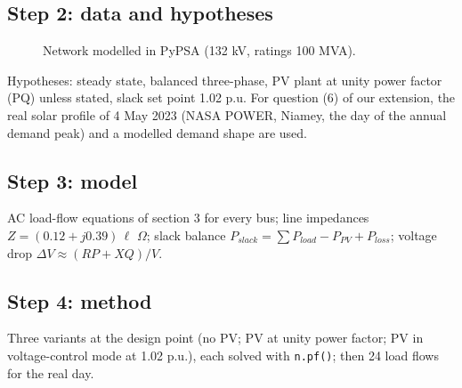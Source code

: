 \documentclass[11pt,a4paper]{article}
\begin{document}
\subsection{Step 2: data and hypotheses}
\begin{figure}[h]\centering
{}
\caption{Network modelled in PyPSA (132 kV, ratings 100 MVA).}
\end{figure}
Hypotheses: steady state, balanced three-phase, PV plant at unity power factor (PQ) unless stated, slack set point 1.02 p.u.
For question (6) of our extension, the real solar profile of 4 May 2023 (NASA POWER, Niamey, the day of the annual
demand peak) and a modelled demand shape are used.

\subsection{Step 3: model}
AC load-flow equations of section 3 for every bus; line impedances $Z = (0.12 + j0.39)\,\ell$ $\Omega$; slack
balance $P_{slack} = \sum P_{load} - P_{PV} + P_{loss}$; voltage drop $\Delta V \approx (RP + XQ)/V$.

\subsection{Step 4: method}
Three variants at the design point (no PV; PV at unity power factor; PV in voltage-control mode at 1.02 p.u.), each solved
with \texttt{n.pf()}; then 24 load flows for the real day.
\end{document}

